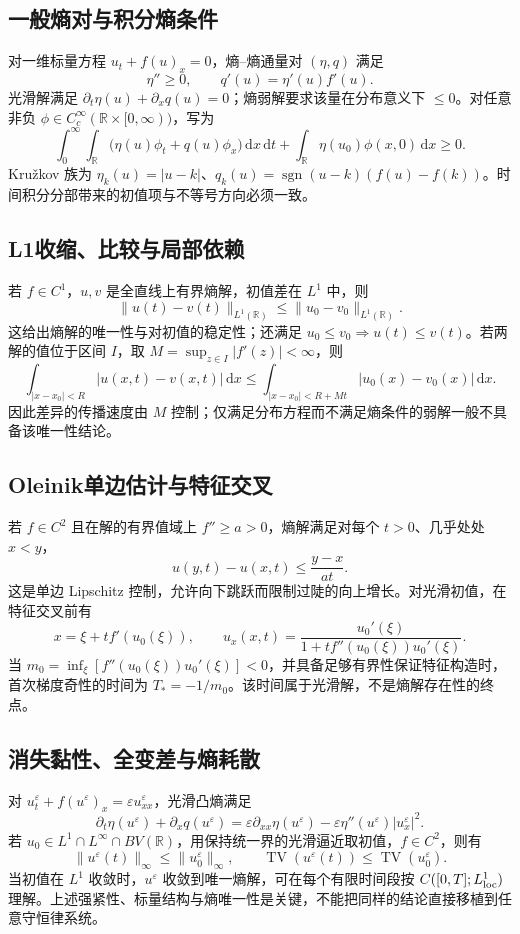 \documentclass[../main.tex]{subfiles}
\begin{document}
\subsection{一般熵对与积分熵条件}
对一维标量方程 $u_t+f(u)_x=0$，熵--熵通量对 $(\eta,q)$ 满足
\[
\eta''\ge0,\qquad q'(u)=\eta'(u)f'(u).
\]
光滑解满足 $\partial_t\eta(u)+\partial_xq(u)=0$；熵弱解要求该量在分布意义下 $\le0$。对任意非负 $\phi\in C_c^\infty(\mathbb R\times[0,\infty))$，写为
\[
\int_0^\infty\!\int_{\mathbb R}
\bigl(\eta(u)\phi_t+q(u)\phi_x\bigr)\,\mathrm dx\,\mathrm dt
+\int_{\mathbb R}\eta(u_0)\phi(x,0)\,\mathrm dx\ge0.
\]
Kružkov 族为 $\eta_k(u)=|u-k|$、$q_k(u)=\operatorname{sgn}(u-k)(f(u)-f(k))$。时间积分分部带来的初值项与不等号方向必须一致。
\subsection{L1收缩、比较与局部依赖}
若 $f\in C^1$，$u,v$ 是全直线上有界熵解，初值差在 $L^1$ 中，则
\[
\|u(t)-v(t)\|_{L^1(\mathbb R)}\le\|u_0-v_0\|_{L^1(\mathbb R)}.
\]
这给出熵解的唯一性与对初值的稳定性；还满足 $u_0\le v_0\Rightarrow u(t)\le v(t)$。若两解的值位于区间 $I$，取 $M=\sup_{z\in I}|f'(z)|<\infty$，则
\[
\int_{|x-x_0|<R}|u(x,t)-v(x,t)|\,\mathrm dx
\le\int_{|x-x_0|<R+Mt}|u_0(x)-v_0(x)|\,\mathrm dx.
\]
因此差异的传播速度由 $M$ 控制；仅满足分布方程而不满足熵条件的弱解一般不具备该唯一性结论。
\subsection{Oleinik单边估计与特征交叉}
若 $f\in C^2$ 且在解的有界值域上 $f''\ge a>0$，熵解满足对每个 $t>0$、几乎处处 $x<y$，
\[
u(y,t)-u(x,t)\le\frac{y-x}{at}.
\]
这是单边 Lipschitz 控制，允许向下跳跃而限制过陡的向上增长。对光滑初值，在特征交叉前有
\[
x=\xi+t f'(u_0(\xi)),\qquad
u_x(x,t)=\frac{u_0'(\xi)}{1+t f''(u_0(\xi))u_0'(\xi)}.
\]
当 $m_0=\inf_\xi[f''(u_0(\xi))u_0'(\xi)]<0$，并具备足够有界性保证特征构造时，首次梯度奇性的时间为 $T_*=-1/m_0$。该时间属于光滑解，不是熵解存在性的终点。
\subsection{消失黏性、全变差与熵耗散}
对 $u_t^\varepsilon+f(u^\varepsilon)_x=\varepsilon u_{xx}^\varepsilon$，光滑凸熵满足
\[
\partial_t\eta(u^\varepsilon)+\partial_xq(u^\varepsilon)
=\varepsilon\partial_{xx}\eta(u^\varepsilon)
-\varepsilon\eta''(u^\varepsilon)|u_x^\varepsilon|^2.
\]
若 $u_0\in L^1\cap L^\infty\cap BV(\mathbb R)$，用保持统一界的光滑逼近取初值，$f\in C^2$，则有
\[
\|u^\varepsilon(t)\|_\infty\le\|u_0^\varepsilon\|_\infty,\qquad
\operatorname{TV}(u^\varepsilon(t))\le\operatorname{TV}(u_0^\varepsilon).
\]
当初值在 $L^1$ 收敛时，$u^\varepsilon$ 收敛到唯一熵解，可在每个有限时间段按 $C([0,T];L^1_{\rm loc})$ 理解。上述强紧性、标量结构与熵唯一性是关键，不能把同样的结论直接移植到任意守恒律系统。
\end{document}

